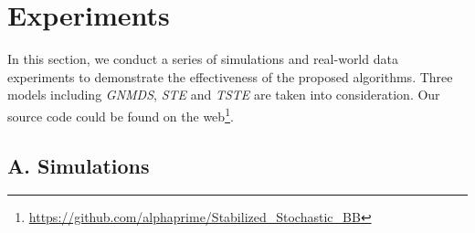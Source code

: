 \documentclass[letterpaper]{article} %
\begin{document}
\section{Experiments}
\label{section:experiment}
 In this section, we conduct a series of simulations and real-world data experiments to demonstrate the effectiveness of the proposed algorithms.
 Three models including \textit{GNMDS}, \textit{STE} and \textit{TSTE} are taken into consideration. Our source code could be found on the web\footnote{\url{https://github.com/alphaprime/Stabilized_Stochastic_BB}}.
	
\subsection{A. Simulations}
\end{document}
